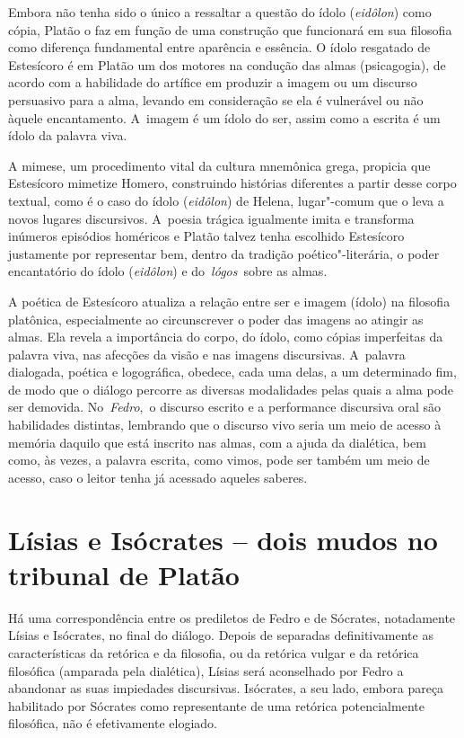 Embora não tenha sido o único a ressaltar a questão do ídolo
(\emph{eidôlon}) como cópia, Platão o faz em função de uma construção
que funcionará em sua filosofia como diferença fundamental entre
aparência e essência. O ídolo resgatado de Estesícoro é em Platão um dos
motores na condução das almas (psicagogia), de acordo com a habilidade
do artífice em produzir a imagem ou um discurso persuasivo para a alma,
levando em consideração se ela é vulnerável ou não àquele encantamento.
A~imagem é um ídolo do ser, assim como a escrita é um ídolo da palavra
viva.

A mimese, um procedimento vital da cultura mnemônica grega, propicia que
Estesícoro mimetize Homero, construindo histórias diferentes a partir
desse corpo textual, como é o caso do ídolo (\emph{eidôlon}) de Helena,
lugar"-comum que o leva a novos lugares discursivos. A~poesia trágica
igualmente imita e transforma inúmeros episódios homéricos e Platão
talvez tenha escolhido Estesícoro justamente por representar bem, dentro
da tradição poético"-literária, o poder encantatório do ídolo
(\emph{eidôlon}) e do~\emph{lógos}~sobre as almas.

A poética de Estesícoro atualiza a relação entre ser e imagem (ídolo) na
filosofia platônica, especialmente ao circunscrever o poder das imagens
ao atingir as almas. Ela revela a importância do corpo, do ídolo, como
cópias imperfeitas da palavra viva, nas afecções da visão e nas imagens
discursivas. A~palavra dialogada, poética e logográfica, obedece, cada
uma delas, a um determinado fim, de modo que o diálogo percorre as
diversas modalidades pelas quais a alma pode ser demovida.
No~\emph{Fedro},~o discurso escrito e a performance discursiva oral são
habilidades distintas, lembrando que o discurso vivo seria um meio de
acesso à memória daquilo que está inscrito nas almas, com a ajuda da
dialética, bem como, às vezes, a palavra escrita, como vimos, pode ser
também um meio de acesso, caso o leitor tenha já acessado aqueles
saberes.

 

\section{Lísias e Isócrates -- dois mudos no tribunal de Platão}

 

Há uma correspondência entre os prediletos de Fedro e de Sócrates,
notadamente Lísias e Isócrates, no final do diálogo. Depois de separadas
definitivamente as características da retórica e da filosofia, ou da
retórica vulgar e da retórica filosófica (amparada pela dialética),
Lísias será aconselhado por Fedro a abandonar as suas impiedades
discursivas. Isócrates, a seu lado, embora pareça habilitado por
Sócrates como representante de uma retórica potencialmente filosófica,
não é efetivamente elogiado.


